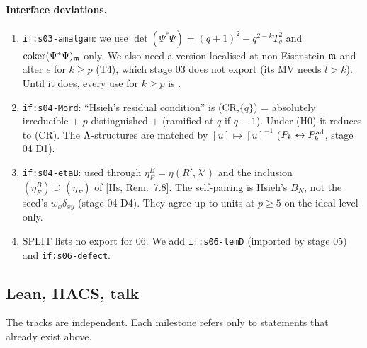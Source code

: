 \paragraph{Interface deviations.}
\begin{enumerate}[label=(D\arabic*)]
\item \texttt{if:s03-amalgam}: we use $\det(\Psi^*\Psi)=(q+1)^2-q^{2-k}T_q^2$ and $\operatorname{coker}(\Psi^*\Psi)_{\mathfrak{m}}$ only. We also need a
  version localised at non-Eisenstein $\mathfrak{m}$ and after $e$ for $k\ge p$ (T4), which stage 03 does not export (its MV needs $l>k$).
  Until it does, every use for $k\ge p$ is \stexp. 
\item \texttt{if:s04-Mord}: ``Hsieh's residual condition'' is (CR,$\{q\}$) = absolutely irreducible $+$ $p$-distinguished $+$
  (ramified at $q$ if $q\equiv1$). Under (H0) it reduces to (CR). The $\Lambda$-structures are matched by $[u]\mapsto[u]^{-1}$
  ($P_k\leftrightarrow P^{\rm ad}_k$, stage 04 D1).
\item \texttt{if:s04-etaB}: used through $\eta^B_F=\eta(R',\lambda')$ and the inclusion $(\eta^B_F)\supseteq(\eta_F)$ of [Hs, Rem.~7.8].
  The self-pairing is Hsieh's $B_N$, not the seed's $w_x\delta_{xy}$ (stage 04 D4). They agree up to units at $p\ge5$ on the
  ideal level only.
\item SPLIT lists no export for 06. We add \texttt{if:s06-lemD} (imported by stage 05) and \texttt{if:s06-defect}.
\end{enumerate}

\subsection{Lean, HACS, talk}
The tracks are independent. Each milestone refers only to statements that already exist above.

